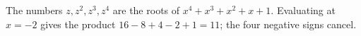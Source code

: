 The numbers $z,z^2,z^3,z^4$ are the roots of $x^4+x^3+x^2+x+1$. Evaluating at $x=-2$ gives the product $16-8+4-2+1=\boxed{11}$; the four negative signs cancel.
